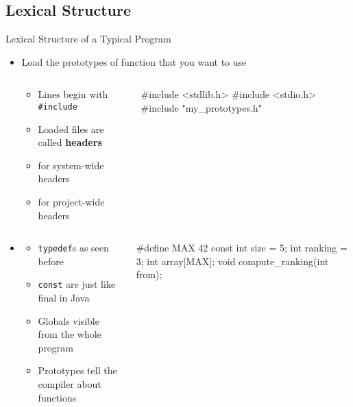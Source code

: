 \begin{Coupe}
\subsection{Lexical Structure}\subtoc
\begin{frame}{Lexical Structure of a Typical Program}
  \begin{itemize}
  \item {} Load the prototypes of function that you
    want to use
    \vspace{-.5\baselineskip}
  \begin{columns}
    \begin{column}{.6\linewidth}
      \begin{itemize}
      \item Lines begin with \texttt{\#include}
      \item Loaded files are called \textbf{headers}
      \item {} for system-wide headers
      \item {} for project-wide headers
      \end{itemize}
    \end{column}
    \begin{column}{.39\linewidth}
      \begin{boitecode}{}
#include <stdlib.h>        
#include <stdio.h>        
#include "my_prototypes.h"

      \end{boitecode}
    \end{column}
  \end{columns}\medskip
\item {} \vspace{-.6\baselineskip} 
  \begin{columns}
    \begin{column}{.6\linewidth}
      \begin{itemize}\vspace{-.8\baselineskip}
      \item \texttt{typedef}s as seen before
      \item \texttt{const} are just like final in Java
      \item Globals visible from the whole program
      \item Prototypes tell the compiler about functions
      \end{itemize}
    \end{column}
    \begin{column}{.39\linewidth}
      \medskip
      \begin{boitecode}{}
#define MAX 42
const int size = 5;
int ranking = 3;
int array[MAX];
void compute_ranking(int from);


\end{boitecode}
\end{column}
\end{columns}
\end{itemize}
\end{frame}
\end{Coupe}
